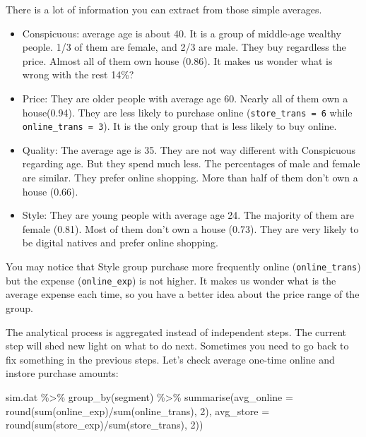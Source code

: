 \documentclass[
  12pt,
]{krantz}
\makeatletter
\newenvironment{Shaded}{\begin{snugshade}}{\end{snugshade}}
\newcommand{\AttributeTok}[1]{\textcolor[rgb]{0.61,0.61,0.61}{#1}}
\newcommand{\DecValTok}[1]{\textcolor[rgb]{0.06,0.06,0.06}{#1}}
\newcommand{\FunctionTok}[1]{\textcolor[rgb]{0,0,0}{#1}}
\newcommand{\NormalTok}[1]{#1}
\newcommand{\SpecialCharTok}[1]{\textcolor[rgb]{0,0,0}{#1}}
\newenvironment{kframe}{%
\medskip{}
\setlength{\fboxsep}{.8em}
 \def\at@end@of@kframe{}%
 \ifinner\ifhmode%
  \def\at@end@of@kframe{\end{minipage}}%
  \begin{minipage}{\columnwidth}%
 \fi\fi%
 \def\FrameCommand##1{\hskip\@totalleftmargin \hskip-\fboxsep
 \colorbox{shadecolor}{##1}\hskip-\fboxsep
     \hskip-\linewidth \hskip-\@totalleftmargin \hskip\columnwidth}%
 \MakeFramed {\advance\hsize-\width
   \@totalleftmargin\z@ \linewidth\hsize
   \@setminipage}}%
 {\par\unskip\endMakeFramed%
 \at@end@of@kframe}
\renewenvironment{Shaded}{\begin{kframe}}{\end{kframe}}
\makeatother
\begin{document}
There is a lot of information you can extract from those simple averages.

\begin{itemize}
\item
  Conspicuous: average age is about 40. It is a group of middle-age wealthy people. 1/3 of them are female, and 2/3 are male. They buy regardless the price. Almost all of them own house (0.86). It makes us wonder what is wrong with the rest 14\%?
\item
  Price: They are older people with average age 60. Nearly all of them own a house(0.94). They are less likely to purchase online (\texttt{store\_trans\ =\ 6} while \texttt{online\_trans\ =\ 3}). It is the only group that is less likely to buy online.
\item
  Quality: The average age is 35. They are not way different with Conspicuous regarding age. But they spend much less. The percentages of male and female are similar. They prefer online shopping. More than half of them don't own a house (0.66).
\item
  Style: They are young people with average age 24. The majority of them are female (0.81). Most of them don't own a house (0.73). They are very likely to be digital natives and prefer online shopping.
\end{itemize}

You may notice that Style group purchase more frequently online (\texttt{online\_trans}) but the expense (\texttt{online\_exp}) is not higher. It makes us wonder what is the average expense each time, so you have a better idea about the price range of the group.

The analytical process is aggregated instead of independent steps. The current step will shed new light on what to do next. Sometimes you need to go back to fix something in the previous steps. Let's check average one-time online and instore purchase amounts:

\begin{Shaded}
\begin{Highlighting}[]
\NormalTok{sim.dat }\SpecialCharTok{\%\textgreater{}\%} 
  \FunctionTok{group\_by}\NormalTok{(segment) }\SpecialCharTok{\%\textgreater{}\%} 
  \FunctionTok{summarise}\NormalTok{(}\AttributeTok{avg\_online =} \FunctionTok{round}\NormalTok{(}\FunctionTok{sum}\NormalTok{(online\_exp)}\SpecialCharTok{/}\FunctionTok{sum}\NormalTok{(online\_trans), }\DecValTok{2}\NormalTok{),}
            \AttributeTok{avg\_store =} \FunctionTok{round}\NormalTok{(}\FunctionTok{sum}\NormalTok{(store\_exp)}\SpecialCharTok{/}\FunctionTok{sum}\NormalTok{(store\_trans), }\DecValTok{2}\NormalTok{))}
\end{Highlighting}
\end{Shaded}
\end{document}
